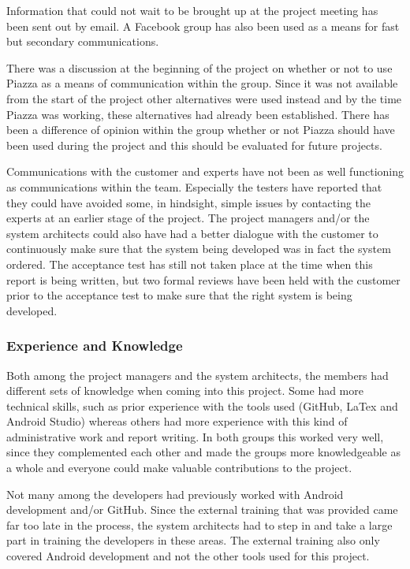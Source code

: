 \documentclass[a4paper]{article}
\begin{document}
Information that could not wait to be brought up at the project meeting has been sent out by email. A Facebook group has also been used as a means for fast but secondary communications.

There was a discussion at the beginning of the project on whether or not to use Piazza as a means of communication within the group. Since it was not available from the start of the project other alternatives were used instead and by the time Piazza was working, these alternatives had already been established. There has been a difference of opinion within the group whether or not Piazza should have been used during the project and this should be evaluated for future projects.

Communications with the customer and experts have not been as well functioning as communications within the team. Especially the testers have reported that they could have avoided some, in hindsight, simple issues by contacting the experts at an earlier stage of the project. The project managers and/or the system architects could also have had a better dialogue with the customer to continuously make sure that the system being developed was in fact the system ordered. The acceptance test has still not taken place at the time when this report is being written, but two formal reviews have been held with the customer prior to the acceptance test to make sure that the right system is being developed.



\subsubsection{Experience and Knowledge}
Both among the project managers and the system architects, the members had different sets of knowledge when coming into this project. Some had more technical skills, such as prior experience with the tools used (GitHub, LaTex and Android Studio) whereas others had more experience with this kind of administrative work and report writing. In both groups this worked very well, since they complemented each other and made the groups more knowledgeable as a whole and everyone could make valuable contributions to the project.

Not many among the developers had previously worked with Android development and/or GitHub. Since the external training that was provided came far too late in the process, the system architects had to step in and take a large part in training the developers in these areas. The external training also only covered Android development and not the other tools used for this project.
\end{document}
